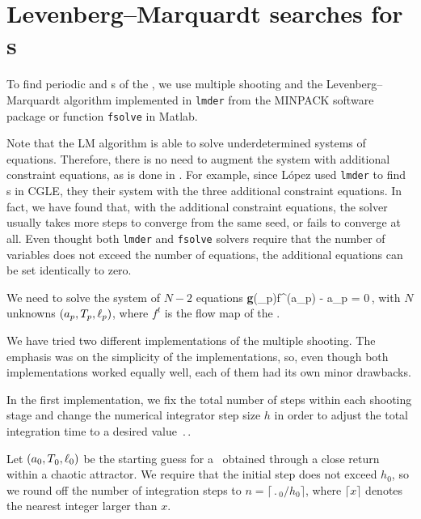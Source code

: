 
\section{Levenberg--Marquardt searches for \rpo s}
\label{sec:lmderRLD}

To find periodic and \rpo s of the \KSe , we use multiple shooting and
the Levenberg--Marquardt algorithm implemented in {\tt lmder} from
the MINPACK software package or function {\tt fsolve} in Matlab.

Note that the LM algorithm is able to solve underdetermined systems of
equations.  Therefore, there is no need to augment the system with
additional constraint equations, as is done in
.
For example, since L{\'o}pez {\etal} used {\tt lmder} to
find \rpo s in CGLE, they  their system with the
three additional constraint equations.  In fact, we have found that,
with the additional constraint equations, the solver usually takes more
steps to converge from the same seed, or fails to converge at all. Even
thought both {\tt lmder} and {\tt fsolve} solvers require that the
number of variables does not exceed the number of equations, the
additional equations can be set identically to zero.

We need to solve the system of $N-2$ equations
\beq
  {\bf g}(\shift_p)f^(a_p) - a_p = 0\,,
with $N$ unknowns $(a_p, {T_{p}}, \ell_p)$, where $f^t$
is the flow map of the \KSe.

We have tried two different implementations of the multiple shooting.
The emphasis was on the simplicity of the implementations, so, even
though both implementations worked equally well, each of them had
its own minor drawbacks.

In the first implementation, we fix the total number of steps within
each shooting stage and change the numerical integrator step size
$h$ in order to adjust the total integration time to a desired value
$\period{}$.

Let $(a_0, {T_{}}_0, \ell_0)$ be the starting guess for a \rpo\
obtained through a close return within a chaotic attractor.  We
require that the initial step does not exceed $h_0$, so we round off the
number of integration steps to $n = \lceil \period{}_0/h_0\rceil$, where
$\lceil x \rceil$ denotes the nearest integer larger than $x$.


